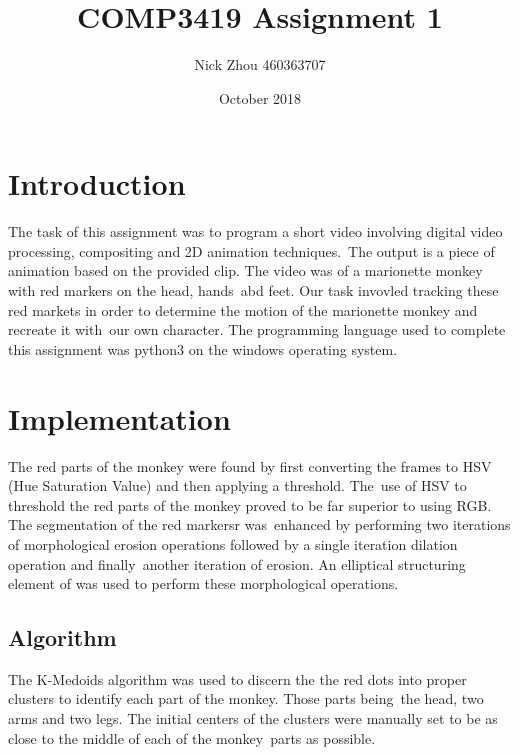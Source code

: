 \documentclass[12pt,a4paper]{article}
\begin{document}
    \begin{titlepage}
        \title{COMP3419 Assignment 1}
        \author{Nick Zhou 460363707}
        \date{October 2018}
        \maketitle
    \end{titlepage}

    \begin{tableofcontents}
        \tableofcontents
        \pagebreak
    \end{tableofcontents}

    \section{Introduction}
    The task of this assignment was to program a short video involving digital video processing, compositing and 2D animation techniques.\
    The output is a piece of animation based on the provided clip. The video was of a marionette monkey with red markers on the head, hands\
    abd feet. Our task invovled tracking these red markets in order to determine the motion of the marionette monkey and recreate it with\
    our own character. The programming language used to complete this assignment was python3 on the windows operating system.

    \section{Implementation}
    The red parts of the monkey were found by first converting the frames to HSV (Hue Saturation Value) and then applying a threshold. The\
    use of HSV to threshold the red parts of the monkey proved to be far superior to using RGB. The segmentation of the red markersr was\
    enhanced by performing two iterations of morphological erosion operations followed by a single iteration dilation operation and finally\
    another iteration of erosion. An elliptical structuring element of was used to perform these morphological operations.

      \subsection{Algorithm}
      The K-Medoids algorithm was used to discern the the red dots into proper clusters to identify each part of the monkey. Those parts being\
      the head, two arms and two legs. The initial centers of the clusters were manually set to be as close to the middle of each of the monkey\
      parts as possible.
\end{document}
